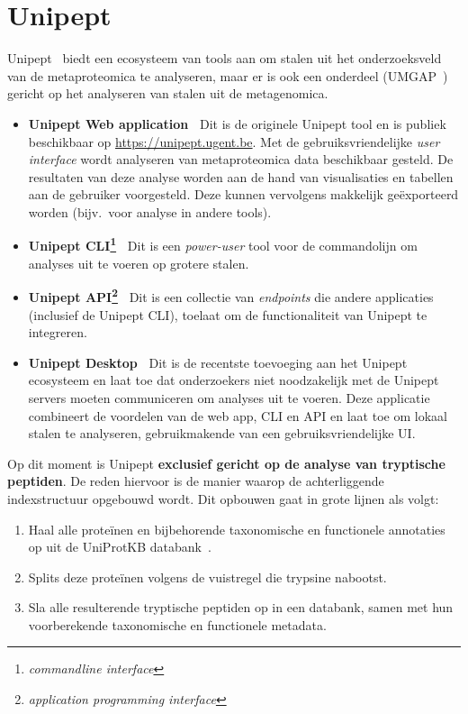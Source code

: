 \section{Unipept}\label{sec:unipept-introductie}
Unipept~\cite{unipept_orig} biedt een ecosysteem van tools aan om stalen uit het onderzoeksveld van de metaproteomica te analyseren, maar er is ook een onderdeel (UMGAP~\cite{UMGAP_paper}) gericht op het analyseren van stalen uit de metagenomica.

\begin{itemize}
    \item \textbf{Unipept Web application~\cite{unipept_orig, unipept_web, unipept_tutorial, unipept_4}} Dit is de originele Unipept tool en is publiek beschikbaar op \url{https://unipept.ugent.be}.
    Met de gebruiksvriendelijke \textit{user interface} wordt analyseren van metaproteomica data beschikbaar gesteld.
    De resultaten van deze analyse worden aan de hand van visualisaties en tabellen aan de gebruiker voorgesteld.
    Deze kunnen vervolgens makkelijk geëxporteerd worden (bijv.~voor analyse in andere tools).
    \item \textbf{Unipept CLI\footnote{\textit{commandline interface}}~\cite{unipept_cli}} Dit is een \textit{power-user} tool voor de commandolijn om analyses uit te voeren op grotere stalen.
    \item \textbf{Unipept API\footnote{\textit{application programming interface}}~\cite{unipept_api, unipept_cli}} Dit is een collectie van \textit{endpoints} die andere applicaties (inclusief de Unipept CLI), toelaat om de functionaliteit van Unipept te integreren.
    \item \textbf{Unipept Desktop~\cite{unipept_desktop, unipept_desktop_2}} Dit is de recentste toevoeging aan het Unipept ecosysteem en laat toe dat onderzoekers niet noodzakelijk met de Unipept servers moeten communiceren om analyses uit te voeren.
    Deze applicatie combineert de voordelen van de web app, CLI en API en laat toe om lokaal stalen te analyseren, gebruikmakende van een gebruiksvriendelijke UI\@.

\end{itemize}

Op dit moment is Unipept \textbf{exclusief gericht op de analyse van tryptische peptiden}.
De reden hiervoor is de manier waarop de achterliggende indexstructuur opgebouwd wordt.
Dit opbouwen gaat in grote lijnen als volgt:

\begin{enumerate}
    \item Haal alle proteïnen en bijbehorende taxonomische en functionele annotaties op uit de UniProtKB databank~\cite{UniprotKB}.
    \item Splits deze proteïnen volgens de vuistregel die trypsine nabootst.
    \item Sla alle resulterende tryptische peptiden op in een databank, samen met hun voorberekende taxonomische en functionele metadata.
\end{enumerate}

